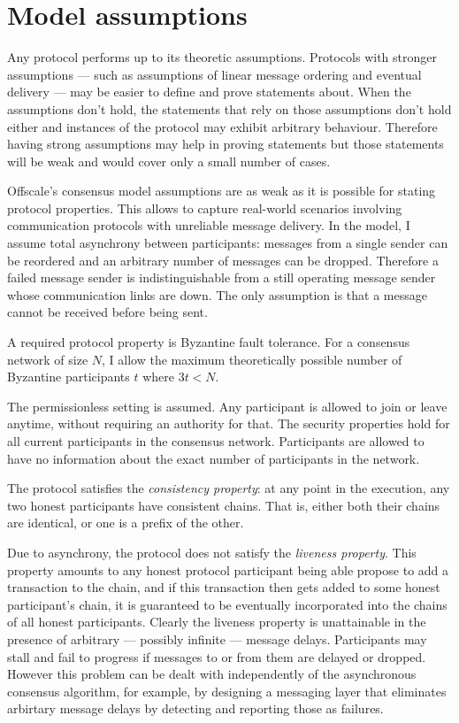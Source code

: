 \documentclass[a4paper,11pt]{article}
\begin{document}
\section{Model assumptions}\label{sec:assumptions}

Any protocol performs up to its theoretic assumptions. Protocols with stronger assumptions --- such
as assumptions of linear message ordering and eventual delivery --- may be easier to define and
prove statements about. When the assumptions don't hold, the statements that rely on those
assumptions don't hold either and instances of the protocol may exhibit arbitrary
behaviour. Therefore having strong assumptions may help in proving statements but those statements
will be weak and would cover only a small number of cases.

Offscale's consensus model assumptions are as weak as it is possible for stating protocol
properties. This allows to capture real-world scenarios involving communication protocols with
unreliable message delivery. In the model, I assume total asynchrony between participants: messages
from a single sender can be reordered and an arbitrary number of messages can be dropped. Therefore
a failed message sender is indistinguishable from a still operating message sender whose
communication links are down. The only assumption is that a message cannot be received before being
sent.

A required protocol property is Byzantine fault tolerance. For a consensus network of size $N$, I
allow the maximum theoretically possible number of Byzantine participants $t$ where $3t < N$.

The permissionless setting is assumed. Any participant is allowed to join or leave anytime, without
requiring an authority for that. The security properties hold for all current participants in the
consensus network. Participants are allowed to have no information about the exact number of
participants in the network.

The protocol satisfies the \emph{consistency property}: at any point in the execution, any two
honest participants have consistent chains. That is, either both their chains are identical, or one
is a prefix of the other.

Due to asynchrony, the protocol does not satisfy the \emph{liveness property}. This property amounts
to any honest protocol participant being able propose to add a transaction to the chain, and if this
transaction then gets added to some honest participant's chain, it is guaranteed to be eventually
incorporated into the chains of all honest participants. Clearly the liveness property is
unattainable in the presence of arbitrary --- possibly infinite --- message delays. Participants may
stall and fail to progress if messages to or from them are delayed or dropped. However this problem
can be dealt with independently of the asynchronous consensus algorithm, for example, by designing a
messaging layer that eliminates arbirtary message delays by detecting and reporting those as
failures.
\end{document}
